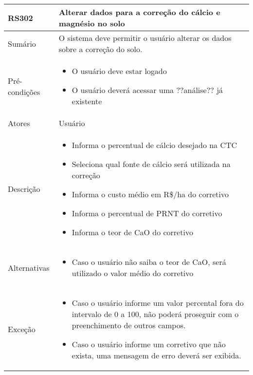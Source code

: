 \begin{quadro}[!htb]
    \begin{tabular}{|p{3cm}|p{11cm}|}
        \hline
        \textbf{RS302} & \textbf{Alterar dados para a correção do cálcio e magnésio no solo} \\
        \hline
        Sumário        & O sistema deve permitir o usuário alterar os dados sobre a correção do solo.                  \\
        \hline
        Pré-condições  & \begin{itemize}
            \item O usuário deve estar logado
            \item O usuário deverá acessar uma ??análise?? já existente 
        \end{itemize}                 \\
        \hline
        Atores         & Usuário                  \\
        \hline
        Descrição      &
        \begin{itemize}
            \item Informa o percentual de cálcio desejado na CTC
            \item Seleciona qual fonte de cálcio será utilizada na correção
            \item Informa o custo médio em R\$/ha do corretivo
            \item Informa o percentual de PRNT do corretivo
            \item Informa o teor de CaO do corretivo
        \end{itemize}                 \\
        \hline
        Alternativas   &
        \begin{itemize}
            \item Caso o usuário não saiba o teor de CaO, será utilizado o valor médio do corretivo
        \end{itemize}                 \\
        \hline
        Exceção        &
        \begin{itemize}
            \item Caso o usuário informe um valor percental fora do intervalo de 0 a 100, não poderá proseguir com o preenchimento de outros campos.
            \item Caso o usuário informe um corretivo que não exista, uma mensagem de erro deverá ser exibida.
        \end{itemize}                   \\
        \hline
    \end{tabular}
\end{quadro}

